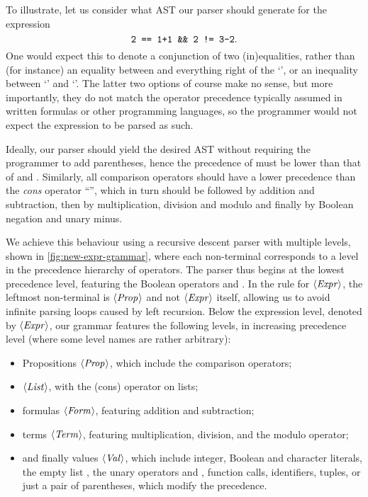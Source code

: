 To illustrate, let us consider what AST our parser should generate for the
expression
\[ \texttt{2 == 1+1 \&\& 2 != 3-2} .\]
One would expect this to denote a conjunction of two (in)equalities, rather than
(for instance) an equality between  and everything right of the
`\code{==}', or an inequality between `' and `'.
%
The latter two options of course make no sense, but more importantly, they do
not match the operator precedence typically assumed in written formulas or other
programming languages, so the programmer would not expect the expression to be
parsed as such.

Ideally, our parser should yield the desired AST without requiring the
programmer to add parentheses, hence the precedence of \code{\&\&} must be lower
than that of \code{==} and \code{!=}.
Similarly, all comparison operators should have a lower precedence than the
\emph{cons} operator ``\code{:}'', which in turn should be followed by addition
and subtraction, then by multiplication, division and modulo and finally by
Boolean negation and unary minus.

We achieve this behaviour using a recursive descent parser with multiple levels,
shown in \cref{fig:new-expr-grammar}, where each non-terminal corresponds to a
level in the precedence hierarchy of operators.
%
The parser thus begins at the lowest precedence level, featuring the Boolean
operators \code{\&\&} and \code{||}.
In the rule for $\langle \textit{Expr}\kern.7pt \rangle$, the leftmost non-terminal is $\langle \textit{Prop}\kern.7pt \rangle$ and not
$\langle \textit{Expr}\kern.7pt \rangle$ itself, allowing us to avoid infinite parsing loops caused by left
recursion.
%
Below the expression level, denoted by $\langle \textit{Expr}\kern.7pt \rangle$, our grammar
features the following levels, in increasing precedence level (where some level
names are rather arbitrary):
\begin{itemize}
  \item Propositions $\langle \textit{Prop}\kern.7pt \rangle$, which include the comparison operators;
  \item $\langle \textit{List}\kern.7pt \rangle$, with the \spl{:} (cons) operator on lists;
  \item formulas $\langle \textit{Form}\kern.7pt \rangle$, featuring addition and subtraction;
  \item terms $\langle \textit{Term}\kern.7pt \rangle$, featuring multiplication, division, and the modulo
        operator;
  \item and finally values $\langle \textit{Val}\kern.7pt \rangle$, which include integer, Boolean and
        character literals, the empty list \spl{[]}, the unary operators \spl{!}
        and \spl{-}, function calls, identifiers, tuples, or just a pair of
        parentheses, which modify the precedence.
\end{itemize}

